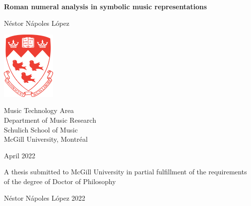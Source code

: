 \begin{titlepage}
\begin{center}
  
    \huge
    \textbf{Roman numeral analysis in symbolic music representations}

    
    \vspace{1cm}

    \LARGE
    N\'estor N\'apoles L\'opez
    
    \vspace{1cm}
    
    \includegraphics[width=0.2\textwidth]{figures/mcgill}

    \vspace{0.5cm}
    
    \large
    Music Technology Area \\
    Department of Music Research \\ 
    Schulich School of Music \\
    McGill University, Montr\'eal \\
    
    \vfill
    
    April 2022
    
    \vspace{2cm}
    
    A thesis submitted to McGill University in partial fulfillment of the requirements of the degree of Doctor of Philosophy
    
    \vspace{1cm}
    
    \textcopyright N\'estor N\'apoles L\'opez 2022 
    
\end{center}
\end{titlepage}